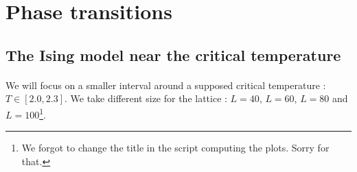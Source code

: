\documentclass[a4paper, twoside, 11pt]{report}
\theoremstyle{theorem}
\theoremstyle{remark}
\theoremstyle{exemple}
\begin{document}
\newpage
    \section{Phase transitions}
    
        \subsection{The Ising model near the critical temperature}
        
            \paragraph{}We will focus on a smaller interval around a supposed critical temperature : $T \in [2.0,2.3]$. We take different size for the lattice : $L=40$, $L=60$, $L=80$ and $L=100$\footnote{We forgot to change the title in the script computing the plots. Sorry for that.}.
            
\end{document}
